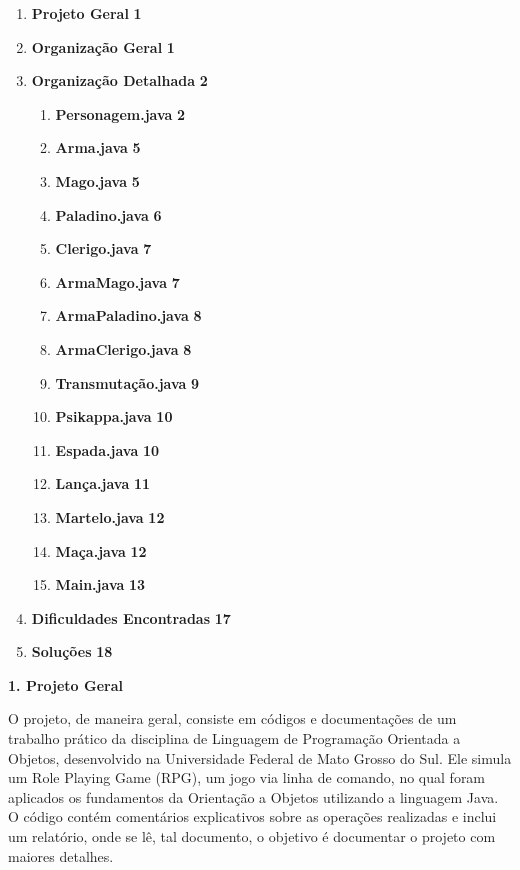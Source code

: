\documentclass[11pt]{uiobrev}
\begin{document}
\begin{enumerate}
    \item \textbf{Projeto Geral} \dotfill \textbf{1}
    \item \textbf{Organização Geral} \dotfill \textbf{1}
    \item \textbf{Organização Detalhada} \dotfill \textbf{2}
        \begin{enumerate}[label*=\arabic*.] 
            \item \textbf{Personagem.java} \dotfill \textbf{2}
            \item \textbf{Arma.java} \dotfill \textbf{5}
            \item \textbf{Mago.java} \dotfill \textbf{5}
            \item \textbf{Paladino.java} \dotfill \textbf{6}
            \item \textbf{Clerigo.java} \dotfill \textbf{7}
            \item \textbf{ArmaMago.java} \dotfill \textbf{7}
            \item \textbf{ArmaPaladino.java} \dotfill \textbf{8}
            \item \textbf{ArmaClerigo.java} \dotfill \textbf{8}
            \item \textbf{Transmutação.java} \dotfill \textbf{9}
            \item \textbf{Psikappa.java} \dotfill \textbf{10}
            \item \textbf{Espada.java} \dotfill \textbf{10}
            \item \textbf{Lança.java} \dotfill \textbf{11}
            \item \textbf{Martelo.java} \dotfill \textbf{12}
            \item \textbf{Maça.java} \dotfill \textbf{12}
            \item \textbf{Main.java} \dotfill \textbf{13}
        \end{enumerate}
    \item \textbf{Dificuldades Encontradas} \dotfill \textbf{17}
    \item \textbf{Soluções} \dotfill \textbf{18}
\end{enumerate}
\thispagestyle{empty}

\newpage

\setcounter{page}{1}

\noindent
\Large \textbf{1. Projeto Geral}

\justifying
O projeto, de maneira geral, consiste em códigos e documentações de um trabalho prático da disciplina de Linguagem de Programação Orientada a Objetos, desenvolvido na Universidade Federal de Mato Grosso do Sul. Ele simula um Role Playing Game (RPG), um jogo via linha de comando, no qual foram aplicados os fundamentos da Orientação a Objetos utilizando a linguagem Java. O código contém comentários explicativos sobre as operações realizadas e inclui um relatório, onde se lê, tal documento, o objetivo é documentar o projeto com maiores detalhes.
\end{document}

